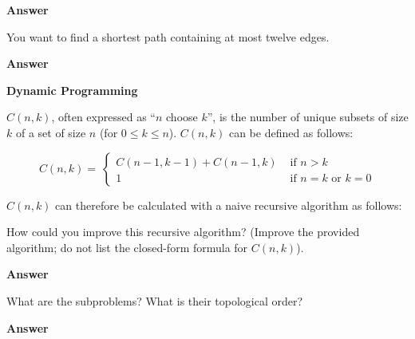 \documentclass[12pt,twoside]{article}
\newcommand{\answer}{
 \par\medskip
 \textbf{Answer}
}
\newcommand{\answerIIc}{ \answer

}
\newcommand{\answerIId}{ \answer

}
\newcommand{\answerIIIa}{ \answer

}
\newcommand{\answerIIIb}{ \answer

}
\begin{document}
\begin{problems}
\begin{problemparts}
  \answerIIc

  \problempart {}
  You want to find a shortest path containing at most twelve edges.

  \answerIId
    
  
\end{problemparts}

\problem {} \textbf{Dynamic Programming}

$C(n, k)$, often expressed as ``$n$ choose $k$'', is the number of
  unique subsets of size $k$ of a set of size $n$ (for $0\leq k \leq n$).
  $C(n, k)$ can be defined as follows:

  $$
    C(n, k) = \
    \begin{cases}
      C(n-1, k-1) + C(n-1, k) & \text{ if } n > k \\
      1 & \text{ if } n = k \text{ or } k = 0
    \end{cases}
  $$

  $C(n, k)$ can therefore be calculated with a naive recursive algorithm
  as follows:

  \begin{algorithm}[H]
  \caption{$\texttt{C}(n, k)$}
  \end{algorithm}

  \begin{problemparts}

  \problempart {}
  How could you improve this recursive algorithm? (Improve the provided
  algorithm; do not list the closed-form formula for $C(n, k)$).

  \answerIIIa

  \problempart {}
  What are the subproblems? What is their topological order?

  \answerIIIb

  \end{problemparts}

\end{problems}
\end{document}
